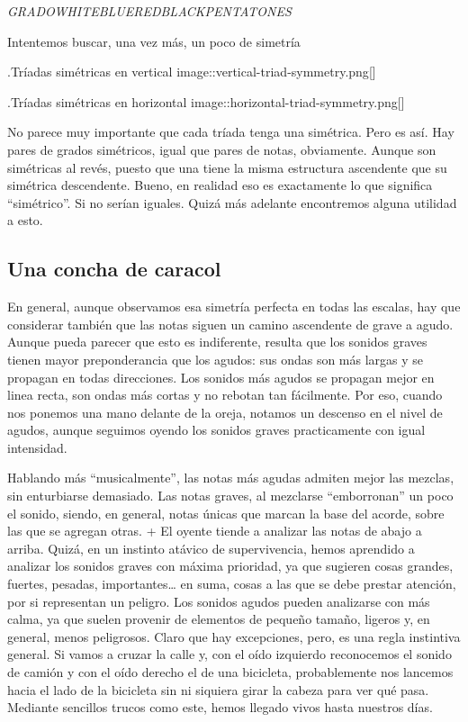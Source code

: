 \documentclass[]{article}
\begin{document}
\emph{GRADO}\emph{WHITE}\emph{BLUE}\emph{RED}\emph{BLACK}\emph{PENTA}\emph{TONES}

 Intentemos buscar, una vez más, un poco de simetría

.Tríadas simétricas en vertical image::vertical-triad-symmetry.png{[}{]}

.Tríadas simétricas en horizontal image::horizontal-triad-symmetry.png{[}{]}

No parece muy importante que cada tríada tenga una simétrica. Pero es así. Hay pares de grados simétricos, igual que pares de notas, obviamente. Aunque son simétricas al revés, puesto que una tiene la misma estructura ascendente que su simétrica descendente. Bueno, en realidad eso es exactamente lo que significa ``simétrico''. Si no serían iguales. Quizá más adelante encontremos alguna utilidad a esto.

\subsection{Una concha de caracol}

En general, aunque observamos esa simetría perfecta en todas las escalas, hay que considerar también que las notas siguen un camino ascendente de grave a agudo. Aunque pueda parecer que esto es indiferente, resulta que los sonidos graves tienen mayor preponderancia que los agudos: sus ondas son más largas y se propagan en todas direcciones. Los sonidos más agudos se propagan mejor en linea recta, son ondas más cortas y no rebotan tan fácilmente. Por eso, cuando nos ponemos una mano delante de la oreja, notamos un descenso en el nivel de agudos, aunque seguimos oyendo los sonidos graves practicamente con igual intensidad.

Hablando más ``musicalmente'', las notas más agudas admiten mejor las mezclas, sin enturbiarse demasiado. Las notas graves, al mezclarse ``emborronan'' un poco el sonido, siendo, en general, notas únicas que marcan la base del acorde, sobre las que se agregan otras. + El oyente tiende a analizar las notas de abajo a arriba. Quizá, en un instinto atávico de supervivencia, hemos aprendido a analizar los sonidos graves con máxima prioridad, ya que sugieren cosas grandes, fuertes, pesadas, importantes\ldots{} en suma, cosas a las que se debe prestar atención, por si representan un peligro. Los sonidos agudos pueden analizarse con más calma, ya que suelen provenir de elementos de pequeño tamaño, ligeros y, en general, menos peligrosos. Claro que hay excepciones, pero, es una regla instintiva general. Si vamos a cruzar la calle y, con el oído izquierdo reconocemos el sonido de camión y con el oído derecho el de una bicicleta, probablemente nos lancemos hacia el lado de la bicicleta sin ni siquiera girar la cabeza para ver qué pasa. Mediante sencillos trucos como este, hemos llegado vivos hasta nuestros días.
\end{document}

